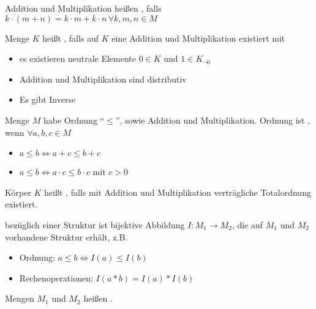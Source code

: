 \begin{definition}[distributiv]
	Addition und Multiplikation heißen , falls $k\cdot(m+n) = k\cdot m + k\cdot n\,\forall k,m,n\in M$
\end{definition}

\begin{definition}[Körper]
	Menge $K$ heißt , falls auf $K$ eine Addition und Multiplikation existiert mit
	\begin{itemize}
		\item es existieren neutrale Elemente $0\in K$ und $1\in K_{\neg 0}$
		\item Addition und Multiplikation sind distributiv
		\item Es gibt Inverse
	\end{itemize}
\end{definition}

\begin{definition}
	Menge $M$ habe Ordnung "`$\le$"', sowie Addition und Multiplikation.
	Ordnung ist , wenn $\forall a,b,c\in M$
	\begin{itemize}
		\item $a\le b \Leftrightarrow a+c \le b+c$
		\item $a\le b \Leftrightarrow a\cdot c \le b\cdot c$ mit $c > 0$
	\end{itemize}
\end{definition}

\begin{definition}[angeordnet]
	Körper $K$ heißt , falls mit Addition und Multiplikation verträgliche Totalordnung existiert.
\end{definition}

\begin{definition}[Isomorphismus]
	 bezüglich einer Struktur ist bijektive Abbildung $I:M_1\rightarrow M_2$, die auf $M_1$ und $M_2$ vorhandene Struktur erhält, z.B. 
	\begin{itemize}
		\item Ordnung: $a\le b\iff I(a)\le I(b)$
		\item Rechenoperationen: $I(a*b)=I(a)*I(b)$
	\end{itemize}
	Mengen $M_1$ und $M_2$ heißen .
\end{definition}

